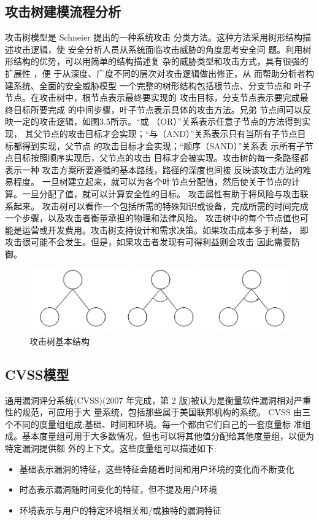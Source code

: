 \subsection{攻击树建模流程分析}

攻击树模型是 Schneier\cite{schneier1999attack} 提出的一种系统攻击
分类方法。这种方法采用树形结构描述攻击逻辑，使
安全分析人员从系统面临攻击威胁的角度思考安全问
题。利用树形结构的优势，可以用简单的结构描述复
杂的威胁类型和攻击方式，具有很强的扩展性 \cite{tuozhan}
，便
于从深度、广度不同的层次对攻击逻辑做出修正，从
而帮助分析者构建系统、全面的安全威胁模型
一个完整的树形结构包括根节点、分支节点和
叶子节点。在攻击树中，根节点表示最终要实现的
攻击目标，分支节点表示要完成最终目标所要完成
的中间步骤，叶子节点表示具体的攻击方法。兄弟
节点间可以反映一定的攻击逻辑，如图3.5所示。“或
（OR）”关系表示任意子节点的方法得到实现，
其父节点的攻击目标才会实现；“与（AND）”关系表示只有当所有子节点目标都得到实现，父节点
的攻击目标才会实现；“顺序（SAND）”关系表
示所有子节点目标按照顺序实现后，父节点的攻击
目标才会被实现。攻击树的每一条路径都表示一种
攻击方案所要遵循的基本路线，路径的深度也间接
反映该攻击方法的难易程度。
一旦树建立起来，就可以为各个叶节点分配值，然后使关于节点的计算。一旦分配了值，就可以计算安全性的目标。
攻击属性有助于将风险与攻击联系起来。
攻击树可以看作一个包括所需的特殊知识或设备，完成所需的时间完成一个步骤，以及攻击者衡量承担的物理和法律风险。
攻击树中的每个节点值也可能是运营或开发费用。攻击树支持设计和需求决策。如果攻击成本多于利益，
即攻击很可能不会发生。但是，如果攻击者发现有可得利益则会攻击 因此需要防御。

\begin{figure}
    \centering
    \includegraphics[scale=0.6]{resources/img/i8.png}
    \caption{攻击树基本结构}
  \end{figure}

\subsection{CVSS模型}

通用漏洞评分系统(CVSS)(2007 年完成，第 2 版)被认为是衡量软件漏洞相对严重性的规范，可应用于大
量系统，包括那些属于美国联邦机构的系统\cite{mell2007common}。
CVSS 由三个不同的度量组组成:基础、时间和环境。每一个都由它们自己的一套度量标
准组成。基本度量组可用于大多数情况，但也可以将其他值分配给其他度量组，以便为特定漏洞提供额
外的上下文。这些度量组可以描述如下:
\begin{itemize}
    \item  基础表示漏洞的特征，这些特征会随着时间和用户环境的变化而不断变化
    \item  时态表示漏洞随时间变化的特征，但不提及用户环境
    \item  环境表示与用户的特定环境相关和/或独特的漏洞特征
\end{itemize}


